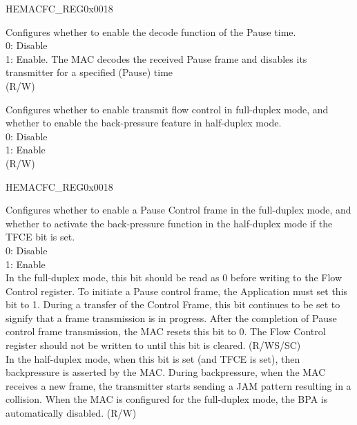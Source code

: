 \begin{register}{H}{EMACFC\_REG}{0x0018}
\begin{regdesc}
\begin{reglist}
\item [RFCE] Configures whether to enable the decode function of the Pause time.\\
0: Disable\\
1: Enable. The MAC decodes the received Pause frame and disables its transmitter for a specified (Pause) time\\(R/W)
\item [TFCE] Configures whether to enable transmit flow control in full-duplex mode, and whether to enable the back-pressure feature in half-duplex mode.\\
0: Disable\\
1: Enable\\
(R/W)

\item[Continued on the next page...]
\end{reglist}\end{regdesc}
\end{register}

\addtocounter{Regfloat}{-1}
\begin{register}{H}{EMACFC\_REG}{0x0018}
\begin{regdesc}\begin{reglist}
\item[Continued from the previous page...]

\item [FCBBA]
Configures whether to enable a Pause Control frame in the full-duplex mode, and whether to activate the back-pressure function in the half-duplex mode if the TFCE bit is set.\\
0: Disable\\
1: Enable\\
In the full-duplex mode, this bit should be read as 0 before writing to the Flow Control register. To initiate a Pause control frame, the Application must set this bit to 1. During a transfer of the Control Frame, this bit continues to be set to signify that a frame transmission is in progress. After the completion of Pause control frame transmission, the MAC resets this bit to 0. The Flow Control register should not be written to until this bit is cleared. (R/WS/SC)\\
In the half-duplex mode, when this bit is set (and TFCE is set), then backpressure is asserted by the MAC. During backpressure, when the MAC receives a new frame, the transmitter starts sending a JAM pattern resulting in a collision. When the MAC is configured for the full-duplex mode, the BPA is automatically disabled. (R/W)
\end{reglist}\end{regdesc}
\end{register}

